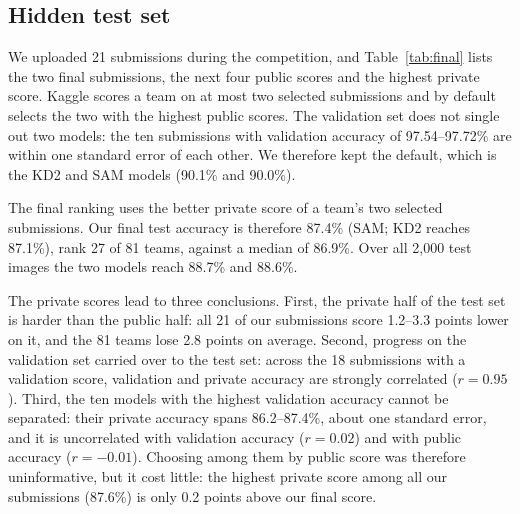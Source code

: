 \documentclass[letterpaper]{article}
\begin{document}
\subsection{Hidden test set}
\label{sec:test}
We uploaded 21 submissions during the competition, and Table~\ref{tab:final} lists the two final submissions, the next four public
scores and the highest private score. Kaggle scores a team on at most two selected submissions and by default selects the two with the highest public scores. The
validation set does not single out two models: the ten submissions with validation accuracy of 97.54--97.72\% are within one standard
error of each other. We therefore kept the default, which is the KD2 and SAM models (90.1\% and 90.0\%).

The final ranking uses the better private score of a team's two selected submissions. Our final test accuracy is therefore
87.4\% (SAM; KD2 reaches 87.1\%), rank 27 of 81 teams, against a median of 86.9\%. Over all 2,000 test images the two models
reach 88.7\% and 88.6\%.

The private scores lead to three conclusions. First, the private half of the test set is harder than the public half: all 21 of
our submissions score 1.2--3.3 points lower on it, and the 81 teams lose 2.8 points on average. Second, progress on the validation set carried over to the test set: across the 18
submissions with a validation score, validation and private accuracy are strongly correlated ($r=0.95$). Third, the ten models with the highest validation accuracy cannot be
separated: their private accuracy spans 86.2--87.4\%, about one standard error, and it is uncorrelated with validation accuracy
($r=0.02$) and with public accuracy ($r=-0.01$). Choosing among them by public score was therefore uninformative, but it cost
little: the highest private score among all our submissions (87.6\%) is only 0.2 points above our final score.
\end{document}
